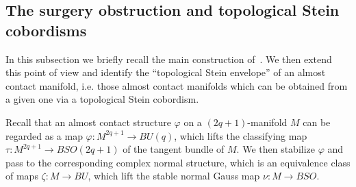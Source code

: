 \documentclass[12pt]{amsart}
\newcommand\acs{\varphi}  				%
\theoremstyle{remark}
\newtheorem{Remark}[Theorem]{Remark}
\begin{document}





\subsection{The surgery obstruction and topological Stein cobordisms} 
\label{subsec:obstruction}
In this subsection we briefly recall the main construction
of~\cite{BCS2}. We then extend this point of view and identify the
``topological Stein envelope'' of an almost contact manifold,
i.e.\,\,those almost contact manifolds which can be obtained from a given one
via a topological Stein cobordism.

Recall that an almost contact structure $\acs$ on a $(2q{+}1)$-manifold $M$ can be regarded
as a map $\acs\colon M^{2q{+}1}\to BU(q)$, which lifts the classifying map 
$\tau \colon M^{2q{+}1}\to BSO(2q{+}1)$ of the tangent bundle of $M$. 
We then stabilize $\acs$ and pass to the corresponding complex normal
structure, which is an equivalence class of maps $\zeta \colon M\to BU$, 
which lift the stable normal Gauss map $\nu \colon M\to BSO$.
 
\end{document}
